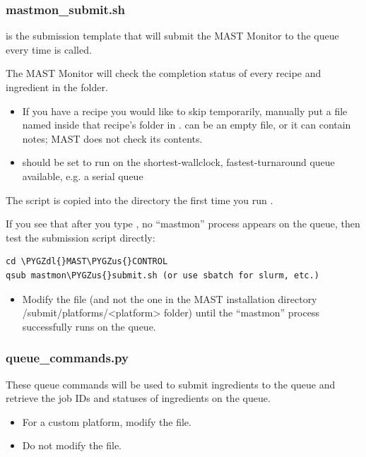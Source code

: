 \documentclass[letterpaper,10pt,english]{sphinxmanual}
\def\PYGZus{\char`\_}
\def\PYGZdl{\char`\$}
\begin{document}
\subsubsection{mastmon\_submit.sh}
\label{1_0_installation:mastmon-submit-sh}
 is the submission template that will submit the MAST Monitor to the queue every time  is called.

The MAST Monitor will check the completion status of every recipe and ingredient in the  folder.
\begin{itemize}
\item {} 
If you have a recipe you would like to skip temporarily, manually put a file named  inside that recipe's folder in .  can be an empty file, or it can contain notes; MAST does not check its contents.

\item {} 
 should be set to run on the shortest-wallclock, fastest-turnaround queue available, e.g. a serial queue

\end{itemize}

The  script is copied into the  directory the first time you run .

If you see that after you type , no ``mastmon'' process appears on the queue, then test the submission script directly:

\begin{Verbatim}[commandchars=\\\{\}]
cd \PYGZdl{}MAST\PYGZus{}CONTROL
qsub mastmon\PYGZus{}submit.sh (or use sbatch for slurm, etc.)
\end{Verbatim}
\begin{itemize}
\item {} 
Modify the  file (and not the one in the MAST installation directory /submit/platforms/\textless{}platform\textgreater{} folder) until the ``mastmon'' process successfully runs on the queue.

\end{itemize}


\subsubsection{queue\_commands.py}
\label{1_0_installation:queue-commands-py}
These queue commands will be used to submit ingredients to the queue and retrieve the job IDs and statuses of ingredients on the queue.
\begin{itemize}
\item {} 
For a custom platform, modify the  file.

\item {} 
Do not modify the  file.

\end{itemize}
\end{document}
